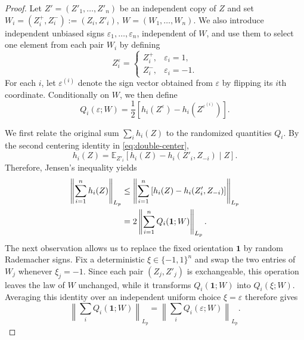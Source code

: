 \documentclass[11pt]{article}
\newcommand{\E}{\mathbb{E}}
\newcommand{\norm}[1]{\left\lVert #1\right\rVert}
\begin{document}
\begin{proof}
Let $Z'=(Z'_1,\ldots,Z'_n)$ be an independent copy of $Z$ and set
\(
W_i=(Z_i^+,Z_i^-):=(Z_i,Z'_i), \ W=(W_1,\ldots, W_n).\)
We also introduce independent unbiased signs $\varepsilon_1,\ldots,\varepsilon_n$, independent of $W$, and use them to select one element from each pair $W_i$ by defining
\[
Z_i^\varepsilon=
\begin{cases}
Z_i^+,&\varepsilon_i=1,\\
Z_i^-,&\varepsilon_i=-1.
\end{cases}
\]
For each $i$, let $\varepsilon^{(i)}$ denote the sign vector obtained from $\varepsilon$ by flipping its $i$th coordinate. Conditionally on $W$, we then define
\[
Q_i(\varepsilon;W)
=
\frac12\left[
h_i(Z^\varepsilon)-h_i(Z^{\varepsilon^{(i)}})
\right].
\]

We first relate the original sum $\sum_i h_i(Z)$ to the randomized quantities $Q_i$. By the second centering identity in \eqref{eq:double-center},
\[ h_i(Z) = \E_{Z'_i} \left[ h_i(Z)-h_i(Z'_i,Z_{-i}) \mid Z \right]. \]
Therefore, Jensen's inequality yields
\begin{align}
\norm{\sum_{i=1}^nh_i(Z)}_{L_p} & \le \norm{ \sum_{i=1}^n \left[h_i(Z)-h_i(Z'_i,Z_{-i})\right]}_{L_p} \notag\\
& = 2\norm{\sum_{i=1}^nQ_i(\mathbf 1;W)}_{L_p}.
\label{eq:symmetrize}
\end{align}
The next observation allows us to replace the fixed orientation $\mathbf 1$ by random Rademacher signs. Fix a deterministic $\xi\in\{-1,1\}^n$ and swap the two entries of $W_j$ whenever $\xi_j=-1$. Since each pair $(Z_j,Z'_j)$ is exchangeable, this operation leaves the law of $W$ unchanged, while it transforms $Q_i(\mathbf1;W)$ into $Q_i(\xi;W)$. Averaging this identity over an independent uniform choice $\xi=\varepsilon$ therefore gives
\begin{equation}\label{eq:orientation}
\norm{\sum_iQ_i(\mathbf1;W)}_{L_p} = \norm{\sum_iQ_i(\varepsilon;W)}_{L_p}.
\end{equation}


\end{proof}
\end{document}
